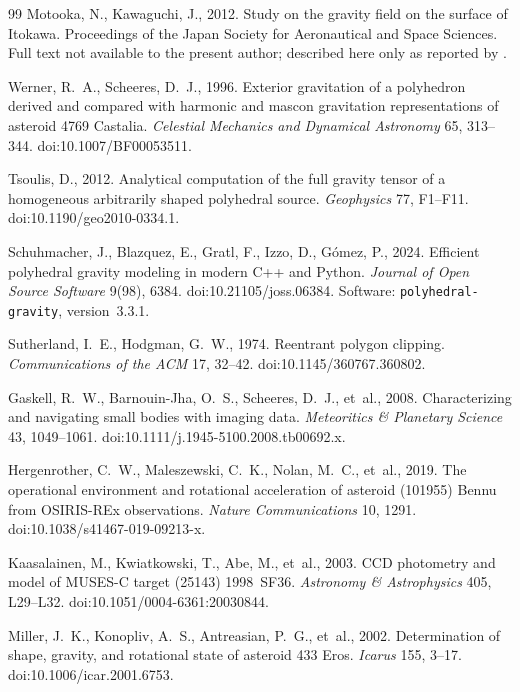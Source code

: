 \documentclass[11pt,a4paper]{article}
\begin{document}
\begin{thebibliography}{99}
Motooka, N., Kawaguchi, J., 2012. Study on the gravity field on the
surface of Itokawa. Proceedings of the Japan Society for Aeronautical and
Space Sciences. Full text not available to the present author; described
here only as reported by \citet{kanamaru2019}.

Werner, R.~A., Scheeres, D.~J., 1996. Exterior gravitation of a
polyhedron derived and compared with harmonic and mascon gravitation
representations of asteroid 4769 Castalia. \emph{Celestial Mechanics
and Dynamical Astronomy} 65, 313--344. doi:10.1007/BF00053511.

Tsoulis, D., 2012. Analytical computation of the full gravity tensor
of a homogeneous arbitrarily shaped polyhedral source. \emph{Geophysics}
77, F1--F11. doi:10.1190/geo2010-0334.1.

Schuhmacher, J., Blazquez, E., Gratl, F., Izzo, D., G\'omez, P., 2024.
Efficient polyhedral gravity modeling in modern C++ and Python.
\emph{Journal of Open Source Software} 9(98), 6384.
doi:10.21105/joss.06384. Software: \texttt{polyhedral-gravity}, version~3.3.1.

Sutherland, I.~E., Hodgman, G.~W., 1974. Reentrant polygon clipping.
\emph{Communications of the ACM} 17, 32--42. doi:10.1145/360767.360802.

Gaskell, R.~W., Barnouin-Jha, O.~S., Scheeres, D.~J., et~al., 2008.
Characterizing and navigating small bodies with imaging data.
\emph{Meteoritics \& Planetary Science} 43, 1049--1061.
doi:10.1111/j.1945-5100.2008.tb00692.x.

Hergenrother, C.~W., Maleszewski, C.~K., Nolan, M.~C., et~al., 2019. The
operational environment and rotational acceleration of asteroid (101955)
Bennu from OSIRIS-REx observations. \emph{Nature Communications} 10, 1291.
doi:10.1038/s41467-019-09213-x.

Kaasalainen, M., Kwiatkowski, T., Abe, M., et~al., 2003. CCD photometry and
model of MUSES-C target (25143) 1998~SF36. \emph{Astronomy \& Astrophysics}
405, L29--L32. doi:10.1051/0004-6361:20030844.

Miller, J.~K., Konopliv, A.~S., Antreasian, P.~G., et~al., 2002.
Determination of shape, gravity, and rotational state of asteroid 433 Eros.
\emph{Icarus} 155, 3--17. doi:10.1006/icar.2001.6753.


\end{thebibliography}
\end{document}
